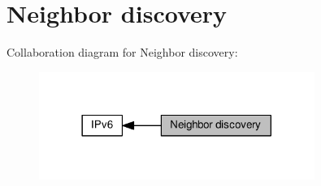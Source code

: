 \hypertarget{group__lwip__opts__nd6}{}\section{Neighbor discovery}
\label{group__lwip__opts__nd6}
Collaboration diagram for Neighbor discovery\+:
\nopagebreak
\begin{figure}[H]
\begin{center}
\leavevmode
\includegraphics[width=254pt]{group__lwip__opts__nd6}
\end{center}
\end{figure}
